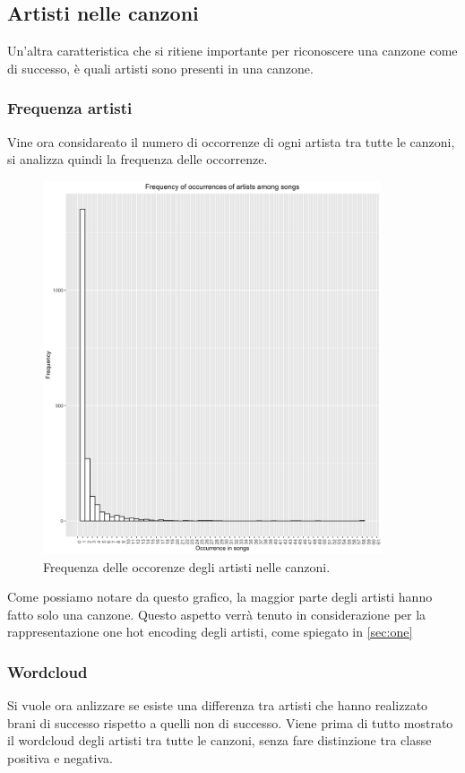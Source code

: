 \subsection{Artisti nelle canzoni}
Un'altra caratteristica che si ritiene importante per riconoscere una canzone come di successo, è quali artisti sono presenti in una canzone.
\subsubsection{Frequenza artisti}
\label{sec:freq_artisti}
Vine ora considareato il numero di occorrenze di ogni artista tra tutte le canzoni, si analizza quindi la frequenza delle occorrenze.

\begin{figure}[H]
	\centering
	\includegraphics[width=10cm]{../images/artists_occurence.png}
	\caption{Frequenza delle occorenze degli artisti nelle canzoni.}
\end{figure}

Come possiamo notare da questo grafico, la maggior parte degli artisti hanno fatto solo una canzone. Questo aspetto verrà tenuto in considerazione per la rappresentazione one hot encoding degli artisti, come spiegato in \autoref{sec:one}

\subsubsection{Wordcloud}
Si vuole ora anlizzare se esiste una differenza tra artisti che hanno realizzato brani di successo rispetto a quelli non di successo. Viene prima di tutto mostrato il wordcloud degli artisti tra tutte le canzoni, senza fare distinzione tra classe positiva e negativa.

